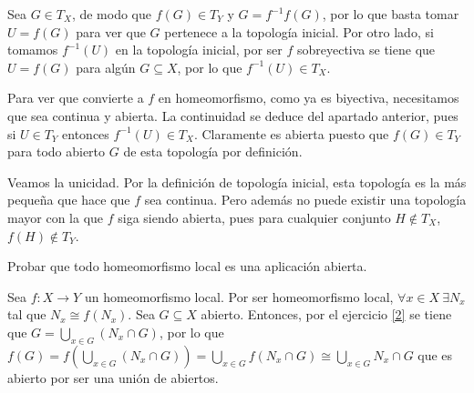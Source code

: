 \documentclass{article}
\begin{document}
\begin{sol}
Sea $G\in T_X$, de modo que $f(G)\in T_Y$ y $G=f^{-1}f(G)$, por lo que basta tomar $U=f(G)$ para ver que $G$ pertenece a la topología inicial. Por otro lado, si tomamos $f^{-1}(U)$ en la topología inicial, por ser $f$ sobreyectiva se tiene que $U=f(G)$ para algún $G\subseteq X$, por lo que $f^{-1}(U)\in T_X$.

Para ver que convierte a $f$ en homeomorfismo, como ya es biyectiva, necesitamos que sea continua y abierta. La continuidad se deduce del apartado anterior, pues si $U\in T_Y$ entonces $f^{-1}(U)\in T_X$. Claramente es abierta puesto que $f(G)\in T_Y$ para todo abierto $G$ de esta topología por definición. 

Veamos la unicidad. Por la definición de topología inicial, esta topología es la más pequeña que hace que $f$ sea continua. Pero además no puede existir una topología mayor con la que $f$ siga siendo abierta, pues para cualquier conjunto $H\notin T_X$, $f(H)\notin T_Y$.
\end{sol}
\newpage

\begin{ejer}
Probar que todo homeomorfismo local es una aplicación abierta.
\end{ejer}

\begin{sol}
Sea $f:X\to Y$ un homeomorfismo local. Por ser homeomorfismo local, $\forall x\in X\ \exists N_x$ tal que $N_x\cong f(N_x)$. Sea $G\subseteq X$ abierto. Entonces, por el ejercicio \ref{2} se tiene que $G=\bigcup_{x\in G} (N_x\cap G)$, por lo que $f(G)=f(\bigcup_{x\in G} (N_x\cap G))=\bigcup_{x\in G}f(N_x\cap G)\cong \bigcup_{x\in G} N_x\cap G$ que es abierto por ser una unión de abiertos.
\end{sol}
\end{document}
